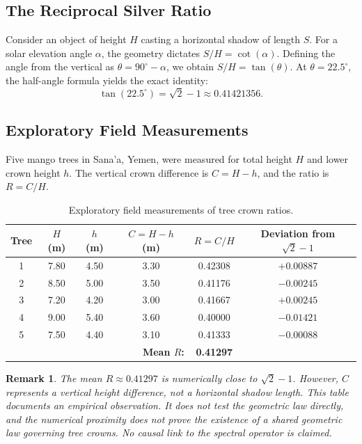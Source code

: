 \documentclass[11pt,a4paper]{article}
\newtheorem{remark}{Remark}
\begin{document}
\subsection{The Reciprocal Silver Ratio}
Consider an object of height \(H\) casting a horizontal shadow of length \(S\). For a solar elevation angle \(\alpha\), the geometry dictates \(S/H = \cot(\alpha)\). Defining the angle from the vertical as \(\theta = 90^\circ - \alpha\), we obtain \(S/H = \tan(\theta)\). At \(\theta = 22.5^\circ\), the half-angle formula yields the exact identity:
\begin{equation}
\tan(22.5^\circ) = \sqrt{2} - 1 \approx 0.41421356.
\end{equation}

\subsection{Exploratory Field Measurements}
Five mango trees in Sana'a, Yemen, were measured for total height \(H\) and lower crown height \(h\). The vertical crown difference is \(C = H - h\), and the ratio is \(R = C/H\). 

\begin{table}[H]
\centering
\caption{Exploratory field measurements of tree crown ratios.}
\label{tab:tree_data}
\begin{tabular}{cccccc}
\toprule
Tree & \(H\) (m) & \(h\) (m) & \(C = H-h\) (m) & \(R = C/H\) & Deviation from \(\sqrt{2}-1\) \\
\midrule
1 & 7.80 & 4.50 & 3.30 & 0.42308 & \(+0.00887\) \\
2 & 8.50 & 5.00 & 3.50 & 0.41176 & \(-0.00245\) \\
3 & 7.20 & 4.20 & 3.00 & 0.41667 & \(+0.00245\) \\
4 & 9.00 & 5.40 & 3.60 & 0.40000 & \(-0.01421\) \\
5 & 7.50 & 4.40 & 3.10 & 0.41333 & \(-0.00088\) \\
\midrule
\multicolumn{4}{r}{\textbf{Mean \(R\):}} & \textbf{0.41297} & \\
\bottomrule
\end{tabular}
\end{table}

\begin{remark}
The mean \(R \approx 0.41297\) is numerically close to \(\sqrt{2}-1\). However, \(C\) represents a vertical height difference, not a horizontal shadow length. This table documents an empirical observation. It does not test the geometric law directly, and the numerical proximity does not prove the existence of a shared geometric law governing tree crowns. No causal link to the spectral operator is claimed.
\end{remark}
\end{document}
